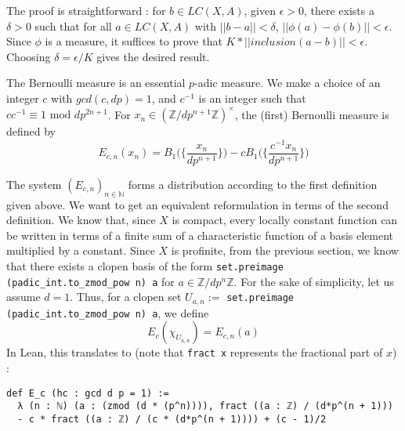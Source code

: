 \documentclass[a4paper,UKenglish,cleveref, autoref, thm-restate]{lipics-v2021}
\newcommand{\lean}[1]{\texttt{#1}\xspace} %
\begin{document}
The proof is straightforward : for $b \in LC(X, A)$, given $\epsilon > 0$, there exists a
$\delta > 0$ such that for all $a \in LC(X, A)$ with $|| b - a || < \delta$,
$|| \phi(a) - \phi(b) || < \epsilon$. Since $\phi$ is a measure, it suffices to prove that
$ K * ||inclusion (a - b)|| < \epsilon $. Choosing $\delta  = \epsilon / K$ gives the desired
result. 

The Bernoulli measure is an essential $p$-adic measure. We make a choice of an integer $c$ with
$gcd(c,dp) = 1$, and $c^{-1}$ is an integer such that $c c^{-1} \equiv 1 \text{ mod } dp^{2n+1}$.
For $x_n \in (\mathbb{Z} / dp^{n +1} \mathbb{Z})^{\times}$, the (first) Bernoulli measure is defined by
$$ E_{c,n}(x_n) = B_1 \bigg( \bigg\{ \frac{x_n}{dp^{n + 1}} \bigg\} \bigg) -
  cB_1 \bigg( \bigg\{ \frac{c^{-1}x_n}{dp^{n + 1}} \bigg\} \bigg) $$

The system $(E_{c,n})_{n \in \mathbb{N}}$ forms a distribution according to the first definition
given above. We want to get an equivalent reformulation in terms of the second definition.
We know that, since $X$ is compact, every locally constant function can be written in terms of a
finite sum of a characteristic function of a basis element multiplied by a constant. Since $X$ is
profinite, from the previous section, we know that there exists a clopen basis of the form
\lean{set.preimage (padic\_int.to\_zmod\_pow n) {a}} for $a \in\mathbb{Z}/dp^{n} \mathbb{Z}$. 
For the sake of simplicity, let us assume $d = 1$. Thus, for a
clopen set $U_{a,n} := $ \lean{set.preimage (padic\_int.to\_zmod\_pow n) {a}}, we define
$$ E_c (\chi_{U_{a,n}}) = E_{c,n} (a) $$
In Lean, this translates to (note that \lean{fract x} represents the fractional part of $x$) :
\begin{lstlisting}
def E_c (hc : gcd d p = 1) := 
  λ (n : ℕ) (a : (zmod (d * (p^n)))), fract ((a : ℤ) / (d*p^(n + 1))) 
  - c * fract ((a : ℤ) / (c * (d*p^(n + 1)))) + (c - 1)/2
\end{lstlisting}

\end{document}
